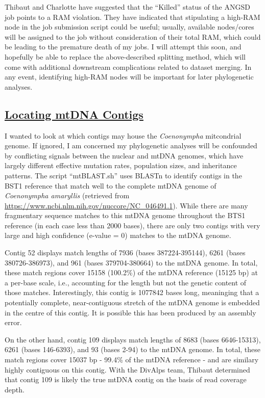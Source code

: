 \documentclass[12pt]{report}
\begin{document}
Thibaut and Charlotte have suggested that the ``Killed'' status of the ANGSD job points to a RAM violation. They have indicated that stipulating a high-RAM node in the job submission script could be useful; usually, available nodes/cores will be assigned to the job without consideration of their total RAM, which could be leading to the premature death of my jobs. I will attempt this soon, and hopefully be able to replace the above-described splitting method, which will come with additional downstream complications related to dataset merging. In any event, identifying high-RAM nodes will be important for later phylogenetic analyses.

\subsection*{\underline{Locating mtDNA Contigs}}

I wanted to look at which contigs may house the \emph{Coenonympha} mitcondrial genome. If ignored, I am concerned my phylogenetic analyses will be confounded by conflicting signals between the nuclear and mtDNA genomes, which have largely different effective mutation rates, population sizes, and inheritance patterns. The script ``mtBLAST.sh'' uses BLASTn to identify contigs in the BST1 reference that match well to the complete mtDNA genome of \emph{Coenonympha amaryllis} (retrieved from \url{https://www.ncbi.nlm.nih.gov/nuccore/NC_046491.1}). While there are many fragmentary sequence matches to this mtDNA genome throughout the BTS1 reference (in each case less than 2000 bases), there are only two contigs with very large and high confidence (e-value = 0) matches to the mtDNA genome.

Contig 52 displays match lengths of 7936 (bases 387224-395144), 6261 (bases 380726-386973), and 961 (bases 379704-380664) to the mtDNA genome. In total, these match regions cover 15158 (100.2\%) of the mtDNA reference (15125 bp) at a per-base scale, i.e., accounting for the length but not the genetic content of those matches. Interestingly, this contig is 1077842 bases long, meaninging that a potentially complete, near-contiguous stretch of the mtDNA genome is embedded in the centre of this contig. It is possible this has been produced by an assembly error.

On the other hand, contig 109 displays match lengths of 8683 (bases 6646-15313), 6261 (bases 146-6393), and 93 (bases 2-94) to the mtDNA genome. In total, these match regions cover 15037 bp - 99.4\% of the mtDNA reference - and are similary highly contiguous on this contig. With the DivAlps team, Thibaut determined that contig 109 is likely the true mtDNA contig on the basis of read coverage depth.
\end{document}
